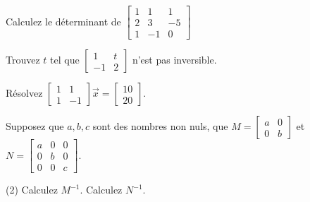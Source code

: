 \setcounter{exercise}{100}

\begin{exercise}
Calculez le déterminant de
$\left[ \begin{smallmatrix}
1 & 1 & 1 \\
2 & 3 & -5 \\
1 & -1 & 0
\end{smallmatrix}\right]$
\end{exercise}

\begin{exercise}
Trouvez $t$ tel que
$\left[ \begin{smallmatrix}
1 & t \\
-1 & 2
\end{smallmatrix}\right]$
n'est pas inversible.
\end{exercise}

\begin{exercise}
Résolvez
$\left[ \begin{smallmatrix}
1 & 1 \\
1 & -1
\end{smallmatrix}\right] \vec{x} = 
\left[ \begin{smallmatrix}
10 \\ 20
\end{smallmatrix}\right]$.
\end{exercise}

\begin{exercise}
Supposez que $a, b, c$ sont des nombres non nuls, que
$M=\left[ \begin{smallmatrix}
a & 0 \\
0 & b
\end{smallmatrix}\right]$ et
$N=\left[ \begin{smallmatrix}
a & 0 & 0 \\
0 & b & 0 \\
0 & 0 & c
\end{smallmatrix}\right]$.
\begin{tasks}(2)
\task Calculez $M^{-1}$.
\task Calculez $N^{-1}$.
\end{tasks}
\end{exercise}

